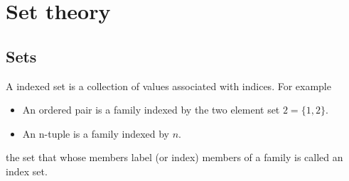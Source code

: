 \chapter{Set theory}


\section{Sets}
A indexed set is a collection of values associated with indices. For example

\begin{itemize}
\item An ordered pair is a family indexed by the two element set $2 = \{1, 2\}$.
\item An n-tuple is a family indexed by $n$.
\end{itemize}

the set that whose members label (or index) members of a family is called an index set.



